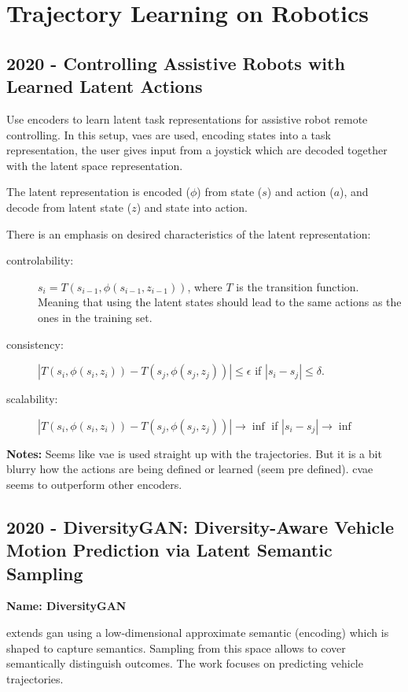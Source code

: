 \section{Trajectory Learning on Robotics}\label{sec: traj learning robotics}

\subsection*{2020 - Controlling Assistive Robots with Learned Latent Actions}

\cite{losey2020controlling} Use encoders to learn latent task representations for assistive robot remote controlling. In this setup, \glspl{vae} are used, encoding states into a task representation, the user gives input from a joystick which are decoded together with the latent space representation.

The latent representation is encoded ($\phi$) from state ($s$) and action ($a$), and decode from latent state ($z$) and state into action.

There is an emphasis on desired characteristics of the latent representation:

\begin{description}
	\item[controlability:] $s_i = T(s_{i-1}, \phi(s_{i-1}, z_{i-1}))$, where $T$ is the transition function. Meaning that using the latent states should lead to the same actions as the ones in the training set.
	\item[consistency:] $|T(s_{i}, \phi(s_{i}, z_{i})) - T(s_{j}, \phi(s_{j}, z_{j}))| \leq \epsilon$ if $|s_i-s_j|\leq \delta$.
	\item[scalability:] $|T(s_{i}, \phi(s_{i}, z_{i})) - T(s_{j}, \phi(s_{j}, z_{j}))| \rightarrow \inf$ if $|s_i-s_j| \rightarrow \inf$
\end{description}

\textbf{Notes:} Seems like \gls{vae} is used straight up with the trajectories. But it is a bit blurry how the actions are being defined or learned (seem pre defined). \gls{cvae} seems to outperform other encoders.

\subsection*{2020 - DiversityGAN: Diversity-Aware Vehicle Motion Prediction via Latent Semantic Sampling}

\textbf{Name: DiversityGAN}

\cite{huang2020diversitygan} extends \gls{gan} using a low-dimensional approximate semantic (encoding) which is shaped to capture semantics. Sampling from this space allows to cover semantically distinguish outcomes. The work focuses on predicting vehicle trajectories.

